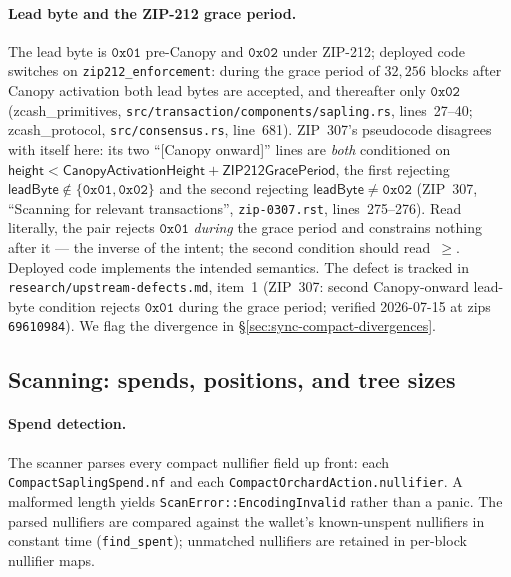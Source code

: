 \documentclass[11pt,a4paper]{article}
\theoremstyle{definition}
\begin{document}
\paragraph{Lead byte and the ZIP-212 grace period.} The lead byte is
$\mathtt{0x01}$ pre-Canopy and $\mathtt{0x02}$ under ZIP-212; deployed code
switches on \texttt{zip212\_enforcement}: during the grace period of
$32{,}256$ blocks after Canopy activation both lead bytes are accepted, and
thereafter only $\mathtt{0x02}$ (\textsf{zcash\_primitives},
\texttt{src/transaction/components/sapling.rs}, lines~27--40;
\textsf{zcash\_protocol}, \texttt{src/consensus.rs}, line~681). ZIP~307's
pseudocode disagrees with itself here: its two ``[Canopy onward]'' lines are
\emph{both} conditioned on $\mathsf{height} < \mathsf{CanopyActivationHeight}
+ \mathsf{ZIP212GracePeriod}$, the first rejecting $\mathsf{leadByte} \notin
\{\mathtt{0x01}, \mathtt{0x02}\}$ and the second rejecting
$\mathsf{leadByte} \neq \mathtt{0x02}$ (ZIP~307, ``Scanning for relevant
transactions'', \texttt{zip-0307.rst}, lines~275--276). Read literally, the
pair rejects $\mathtt{0x01}$ \emph{during} the grace period and constrains
nothing after it --- the inverse of the intent; the second condition should
read~$\geq$. Deployed code implements the intended semantics. The defect
is tracked in \texttt{research/upstream-defects.md}, item~1 (ZIP~307:
second Canopy-onward lead-byte condition rejects $\mathtt{0x01}$ during
the grace period; verified 2026-07-15 at \textsf{zips}
\texttt{69610984}). We flag the
divergence in \S\ref{sec:sync-compact-divergences}.

\subsection{Scanning: spends, positions, and tree sizes}%
\label{sec:sync-compact-scan}

\paragraph{Spend detection.} The scanner parses every compact nullifier
field up front: each
\texttt{CompactSapling}\allowbreak\texttt{Spend.}\allowbreak\texttt{nf}
and each
\texttt{CompactOrchardAction.}\allowbreak\texttt{nullifier}. A malformed
length yields \texttt{ScanError::}\allowbreak\texttt{EncodingInvalid}
rather than a panic. The parsed nullifiers are compared against the
wallet's known-unspent nullifiers in constant time (\texttt{find\_spent});
unmatched nullifiers are retained in per-block nullifier maps.
\end{document}
